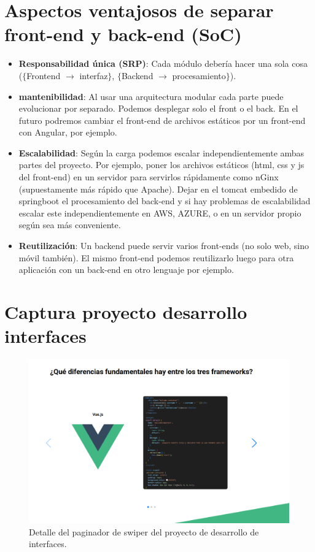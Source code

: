\documentclass[a4paper,12pt]{report}
\begin{document}
		\section{Aspectos ventajosos de separar front-end y back-end (SoC)}
		\label{sec:SoCVENTATJES}
			\begin{itemize}
			\setlength{\itemsep}{.0em}
			\item \textbf{Responsabilidad única (SRP)}: Cada módulo debería hacer una sola cosa ($\{$Frontend $\rightarrow$ interfaz$\}$, $\{$Backend $\rightarrow$ procesamiento$\}$). 
			\item \textbf{mantenibilidad}: Al usar una arquitectura modular cada parte puede evolucionar por separado. Podemos desplegar solo el front o el back. En el futuro podremos cambiar el front-end de archivos estáticos por un front-end con Angular, por ejemplo.
			\item \textbf{Escalabilidad}: Según la carga podemos escalar independientemente ambas partes del proyecto. Por ejemplo, poner los archivos estáticos (html, css y js del front-end) en un servidor para servirlos rápidamente como nGinx \cite{nginx} (supuestamente más rápido que Apache). Dejar en el tomcat embedido de springboot el procesamiento del back-end y si hay problemas de escalabilidad escalar este independientemente en AWS, AZURE, o en un servidor propio según sea más conveniente.
			\item \textbf{Reutilización}: Un backend puede servir varios front-ends (no solo web, sino móvil también). El mismo front-end podemos reutilizarlo luego para otra aplicación con un back-end en otro lenguaje por ejemplo.
		\end{itemize}
		
	\section{Captura proyecto desarrollo interfaces}
	
	\FloatBarrier
	\begin{figure}[H]
		\centering
		\caption{Detalle del paginador de swiper del proyecto de desarrollo de interfaces.}
		\includegraphics[width=1\linewidth]{img/swiperFront.png}

		\label{fig:swiperFront}
	\end{figure}
	\FloatBarrier
	
\end{document}
